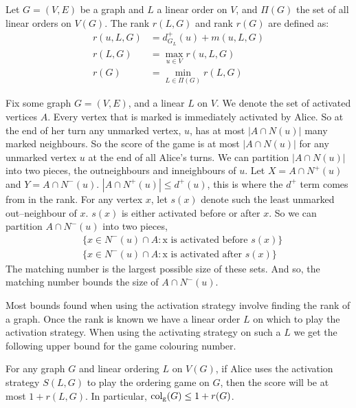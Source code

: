 \begin{definition} \label{defnRank}
    Let $G=(V,E)$ be a graph and $L$ a linear order on $V$, and $\Pi(G)$ the set of all linear orders on $V(G)$. The rank $r(L,G)$ and rank $r(G)$ are defined as:
    \begin{align*}
    r(u,L,G) & = d^+_{G_L}(u) + m(u,L,G) \\
    r(L,G)   & = \max_{u \in V}r(u,L,G)  \\
    r(G)     & = \min_{L \in \Pi(G)} r(L,G)
    \end{align*}
\end{definition}

Fix some graph $G=(V,E)$, and a linear $L$ on $V$. We denote the set of activated vertices $A$. Every vertex that is marked is immediately activated by Alice. So at the end of her turn any unmarked vertex, $u$, has at most $|A\cap N(u)|$ many marked neighbours. So the score of the game is at most $|A\cap N(u)|$ for any unmarked vertex $u$ at the end of all Alice's turns. We can partition $|A\cap N(u)|$ into two pieces, the outneighbours and inneighbours of $u$. Let $X= A\cap N^+(u)$ and $Y=A\cap N^-(u)$.  $|A\cap N^+(u)|\leq d^+(u)$, this is where the $d^+$ term comes from in the rank. For any vertex $x$, let $s(x)$ denote such the least unmarked out--neighbour of $x$. $s(x)$ is either activated before or after $x$. So we can partition $A\cap N^-(u)$ into two pieces,
\begin{align*}
&\{x\in N^-(u)\cap A : \text{x is activated before $s(x)$}\} \\        
&\{x\in N^-(u)\cap A : \text{x is activated after $s(x)$}\}
\end{align*}
The matching number is the largest possible size of these sets. And so, the matching number bounds the size of $A\cap N^-(u)$.

Most bounds found when using the activation strategy involve finding the rank of a graph. Once the rank is known we have a linear order $L$ on which to play the activation strategy. When using the activating strategy on such a $L$ we get the following upper bound for the game colouring number. 

\begin{theorem} \label{thm:KIERSTEAD1}
    For any graph $G$ and linear ordering $L$ on $V(G)$, if Alice uses the activation strategy $S(L, G)$ to play the ordering game on $G$, then the score will be at most $1+r(L, G)$. In particular, $\operatorname{col_g}(G) \leq 1+r(G)$.
\end{theorem}

